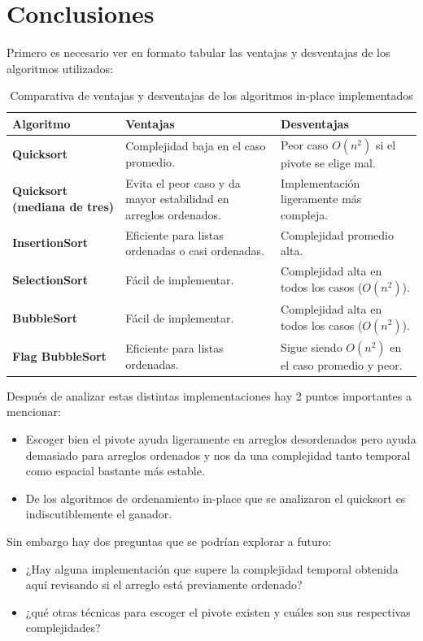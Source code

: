 \documentclass[conference]{IEEEtran}
\begin{document}
\section{Conclusiones}

Primero es necesario ver en formato tabular las ventajas y desventajas de los algoritmos utilizados:
\begin{table}[H]
\caption{Comparativa de ventajas y desventajas de los algoritmos in-place implementados}
\centering
\small
\begin{tabular}{|p{2cm}|p{2.6cm}|p{2.6cm}|}
\hline
\textbf{Algoritmo} & \textbf{Ventajas} & \textbf{Desventajas} \\
\hline
\textbf{Quicksort} & Complejidad baja en el caso promedio. & Peor caso $O(n^2)$ si el pivote se elige mal. \\
\hline
\textbf{Quicksort (mediana de tres)} & Evita el peor caso y da mayor estabilidad en arreglos ordenados. & Implementación ligeramente más compleja. \\
\hline
\textbf{InsertionSort} & Eficiente para listas ordenadas o casi ordenadas. & Complejidad promedio alta. \\
\hline
\textbf{SelectionSort} & Fácil de implementar. & Complejidad alta en todos los casos ($O(n^2)$). \\
\hline
\textbf{BubbleSort} & Fácil de implementar. & Complejidad alta en todos los casos ($O(n^2)$). \\
\hline
\textbf{Flag BubbleSort} & Eficiente para listas ordenadas. & Sigue siendo $O(n^2)$ en el caso promedio y peor. \\
\hline
\end{tabular}\label{tab:pros_contras}
\end{table}


Después de analizar estas distintas implementaciones hay 2 puntos importantes a mencionar:

\begin{itemize}
    \item Escoger bien el pivote ayuda ligeramente en arreglos desordenados pero ayuda demasiado para arreglos ordenados y nos da una complejidad tanto temporal como espacial bastante más estable.
    \item De los algoritmos de ordenamiento in-place que se analizaron el quicksort es indiscutiblemente el ganador.
\end{itemize}

Sin embargo hay dos preguntas que se podrían explorar a futuro:
\begin{itemize}
    \item ¿Hay alguna implementación que supere la complejidad temporal obtenida aquí revisando si el arreglo está previamente ordenado? 
    \item ¿qué otras técnicas para escoger el pivote existen y cuáles son sus respectivas complejidades?
\end{itemize}
\end{document}
